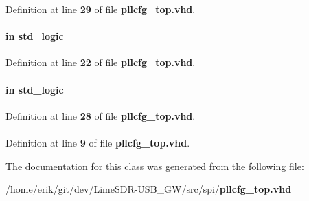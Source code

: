 Definition at line {\bf 29} of file {\bf pllcfg\+\_\+top.\+vhd}.

\paragraph[{senA}]{ {\bfseries \textcolor{keywordflow}{in}\textcolor{vhdlchar}{ }} {\bfseries \textcolor{comment}{std\+\_\+logic}\textcolor{vhdlchar}{ }} \hspace{0.3cm}{\ttfamily [Port]}}\label{classpllcfg__top_aaef2763731b3fb147a2e89dad7a5a699}


Definition at line {\bf 22} of file {\bf pllcfg\+\_\+top.\+vhd}.

\paragraph[{senB}]{ {\bfseries \textcolor{keywordflow}{in}\textcolor{vhdlchar}{ }} {\bfseries \textcolor{comment}{std\+\_\+logic}\textcolor{vhdlchar}{ }} \hspace{0.3cm}{\ttfamily [Port]}}\label{classpllcfg__top_a237687a5eb2d98d47f025e72bd4ae1d8}


Definition at line {\bf 28} of file {\bf pllcfg\+\_\+top.\+vhd}.

\paragraph[{std\+\_\+logic\+\_\+1164}]{\hspace{0.3cm}{\ttfamily [Package]}}\label{classpllcfg__top_acd03516902501cd1c7296a98e22c6fcb}


Definition at line {\bf 9} of file {\bf pllcfg\+\_\+top.\+vhd}.



The documentation for this class was generated from the following file\+:\begin{DoxyCompactItemize}
\item 
/home/erik/git/dev/\+Lime\+S\+D\+R-\/\+U\+S\+B\+\_\+\+G\+W/src/spi/{\bf pllcfg\+\_\+top.\+vhd}\end{DoxyCompactItemize}
